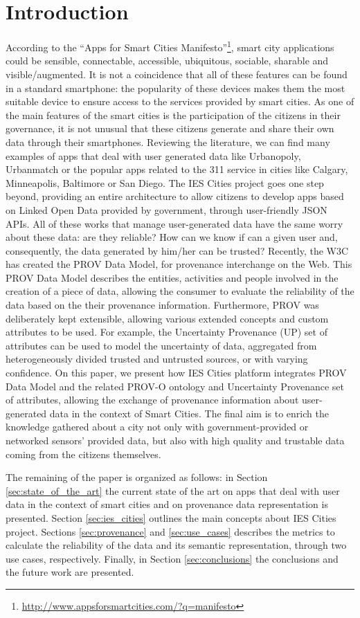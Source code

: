 \section{Introduction}
\label{sec:introduction}

According to the ``Apps for Smart Cities Manifesto''\footnote{\url{http://www.appsforsmartcities.com/?q=manifesto}}, smart city applications could be sensible, connectable, accessible, ubiquitous, sociable, sharable and visible/augmented. It is not a coincidence that all of these features can be found in a standard smartphone: the popularity of these devices makes them the most suitable device to ensure access to the services provided by smart cities. As one of the main features of the smart cities is the participation of the citizens in their governance, it is not unusual that these citizens generate and share their own data through their smartphones. Reviewing the literature, we can find many examples of apps that deal with user generated data like Urbanopoly, Urbanmatch or the popular apps related to the 311 service in cities like Calgary, Minneapolis, Baltimore or San Diego. The IES Cities project goes one step beyond, providing an entire architecture to allow citizens to develop apps based on Linked Open Data provided by government, through user-friendly JSON APIs. All of these works that manage user-generated data have the same worry about these data: are they reliable? How can we know if can a given user and, consequently, the data generated by him/her can be trusted? Recently, the W3C has created the PROV Data Model, for provenance interchange on the Web. This PROV Data Model describes the entities, activities and people involved in the creation of a piece of data, allowing the consumer to evaluate the reliability of the data based on the their provenance information. Furthermore, PROV was deliberately kept extensible, allowing various extended concepts and custom attributes to be used. For example, the Uncertainty Provenance (UP) set of attributes can be used to model the uncertainty of data, aggregated from heterogeneously divided trusted and untrusted sources, or with varying confidence. On this paper, we present how IES Cities platform integrates PROV Data Model and the related PROV-O ontology and Uncertainty Provenance set of attributes, allowing the exchange of provenance information about user-generated data in the context of Smart Cities. The final aim is to enrich the knowledge gathered about a city not only with government-provided or networked sensors’ provided data, but also with high quality and trustable data coming from the citizens themselves.

The remaining of the paper is organized as follows: in Section \ref{sec:state_of_the_art} the current state of the art on apps that deal with user data in the context of smart cities and on provenance data representation is presented. Section \ref{sec:ies_cities} outlines the main concepts about IES Cities project. Sections \ref{sec:provenance} and \ref{sec:use_cases} describes the metrics to calculate the reliability of the data and its semantic representation, through two use cases, respectively. Finally, in Section \ref{sec:conclusions} the conclusions and the future work are presented.

